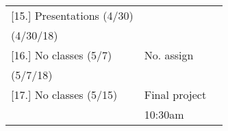 \documentclass[article,oneside]{memoir}
\begin{document}
\begin{center}
\begin{longtable}{p{4.5cm}p{2cm}p{6cm}}
[15.] Presentations (4/30)				& 			& \\ 
(4/30/18)				 		     	&			       	& \\ [1.8\baselineskip]

[16.] No classes (5/7)		    		& No. assign			& \\ 
(5/7/18)				    		  	& 			     	& \\ [1.8\baselineskip]

[17.] No classes (5/15)			    	& Final project		& \\ 
				      				&  10:30am    		& \\

\end{longtable}
\end{center}



\end{document}
